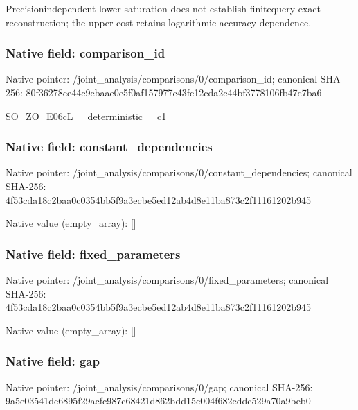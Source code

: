 \documentclass[10pt,a4paper]{article}
\begin{document}
Precisionindependent lower saturation does not establish finitequery exact reconstruction; the upper cost retains logarithmic accuracy dependence.


\subsubsection{Native field: comparison\_id}


Native pointer: /joint\_analysis/comparis\allowbreak{}ons/0/comparison\_id; canonical SHA-256: 80f36278ce44c9ebaae0e5f0\allowbreak{}af157977c43fc12cda2c44bf\allowbreak{}3778106fb47c7ba6


SO\_ZO\_E06cL\_\_deterministic\_\_c1


\subsubsection{Native field: constant\_dependencies}


Native pointer: /joint\_analysis/comparis\allowbreak{}ons/0/constant\_dependenc\allowbreak{}ies; canonical SHA-256: 4f53cda18c2baa0c0354bb5f\allowbreak{}9a3ecbe5ed12ab4d8e11ba87\allowbreak{}3c2f11161202b945



Native value (empty\_array): []



\subsubsection{Native field: fixed\_parameters}


Native pointer: /joint\_analysis/comparis\allowbreak{}ons/0/fixed\_parameters; canonical SHA-256: 4f53cda18c2baa0c0354bb5f\allowbreak{}9a3ecbe5ed12ab4d8e11ba87\allowbreak{}3c2f11161202b945



Native value (empty\_array): []



\subsubsection{Native field: gap}


Native pointer: /joint\_analysis/comparisons/0/gap; canonical SHA-256: 9a5e03541de6895f29acfc98\allowbreak{}7c68421d862bdd15c004f682\allowbreak{}eddc529a70a9beb0
\end{document}

